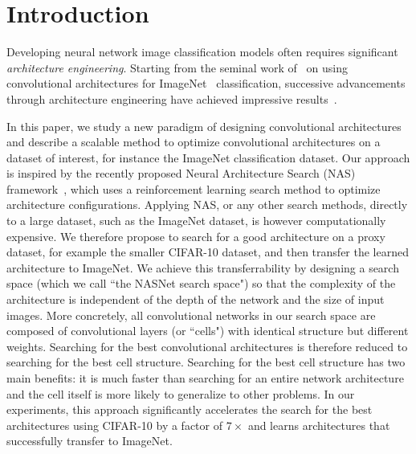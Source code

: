 \section{Introduction}

Developing neural network image classification models often requires significant \emph{architecture engineering}. Starting from the seminal work of~\cite{krizhevsky2012imagenet} on using convolutional architectures \cite{fukushima1982neocognitron,lecun1998gradient} for ImageNet~\cite{deng2009imagenet} classification, successive advancements through architecture engineering have achieved impressive results~\cite{simonyan2014very,szegedy2015going,he2015deep,szegedy2016rethinking,szegedy2016inception,xie2016aggregated}. 


In this paper, we study a new paradigm of designing convolutional architectures and describe a scalable method to optimize convolutional architectures on a dataset of interest, for instance the ImageNet classification dataset. 
Our approach is inspired by the recently proposed Neural Architecture Search (NAS) framework~\cite{zoph2017neural}, which uses a reinforcement learning search method to optimize architecture configurations. Applying NAS, or any other search methods, directly to a large dataset, such as the ImageNet dataset, is however computationally expensive. We therefore propose to search for a good architecture on a proxy dataset, for example the smaller CIFAR-10 dataset, and then transfer the learned architecture to ImageNet. We achieve this transferrability by designing a search space (which we call ``the NASNet search space") so that the complexity of the architecture is independent of the depth of the network and the size of input images. More concretely, all convolutional networks in our search space are composed of convolutional layers (or ``cells") with identical structure but different weights. Searching for the best convolutional architectures is therefore reduced to searching for the best cell structure. Searching for the best cell structure has two main benefits: it is much faster than searching for an entire network architecture and the cell itself is more likely to generalize to other problems. 
In our experiments, this approach significantly accelerates the search for the best architectures using CIFAR-10 by a factor of $7\times$ and learns architectures that successfully transfer to ImageNet.


